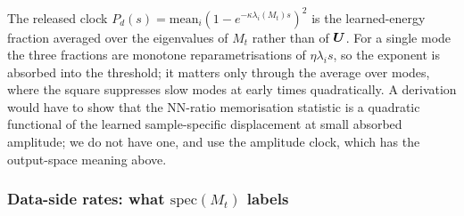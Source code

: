 \begin{remark}\label{rem:square-pred}
The released clock $P_d(s)=\mathrm{mean}_i(1-e^{-\kappa\lambda_i(M_t)s})^2$ is the learned-energy fraction averaged over the eigenvalues of $M_t$ rather than of $\bm{U}$. For a single mode the three fractions are monotone reparametrisations of $\eta\lambda_is$, so the exponent is absorbed into the threshold; it matters only through the average over modes, where the square suppresses slow modes at early times quadratically. A derivation would have to show that the NN-ratio memorisation statistic is a quadratic functional of the learned sample-specific displacement at small absorbed amplitude; we do not have one, and use the amplitude clock, which has the output-space meaning above.
\end{remark}

\subsubsection{Data-side rates: what $\mathrm{spec}(M_t)$ labels}

